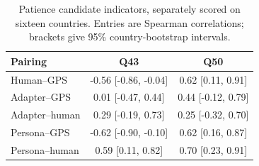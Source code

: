 \begin{table}[htbp]\centering\small
\caption{Patience candidate indicators, separately scored on sixteen countries. Entries are Spearman correlations; brackets give 95\% country-bootstrap intervals.}\label{tab:patience}
\begin{tabular}{lcc}\toprule Pairing & Q43 & Q50\\\midrule
Human--GPS & -0.56 [-0.86, -0.04] & 0.62 [0.11, 0.91] \\
Adapter--GPS & 0.01 [-0.47, 0.44] & 0.44 [-0.12, 0.79] \\
Adapter--human & 0.29 [-0.19, 0.73] & 0.25 [-0.32, 0.70] \\
Persona--GPS & -0.62 [-0.90, -0.10] & 0.62 [0.16, 0.87] \\
Persona--human & 0.59 [0.11, 0.82] & 0.70 [0.23, 0.91] \\
\bottomrule
\end{tabular}\end{table}
